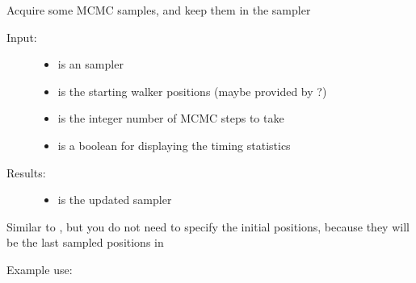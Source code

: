 \documentclass[letterpaper,10pt,english]{sphinxmanual}
\begin{document}
\begin{fulllineitems}
\label{code_mcmc:mcmc.run}
Acquire some MCMC samples, and keep them in the sampler
\begin{description}
\item[{Input:}] \leavevmode\begin{itemize}
\item {} 
 is an  sampler

\item {} 
 is the starting walker positions (maybe provided by ?)

\item {} 
 is the integer number of MCMC steps to take

\item {} 
 is a boolean for displaying the timing statistics

\end{itemize}

\item[{Results:}] \leavevmode\begin{itemize}
\item {} 
 is the updated  sampler

\end{itemize}

\end{description}

\end{fulllineitems}


\begin{fulllineitems}
\label{code_mcmc:mcmc.continue_run}
Similar to , but you do not need to specify the initial positions, because they will be the last sampled positions in 

\end{fulllineitems}


Example use:
\end{document}
